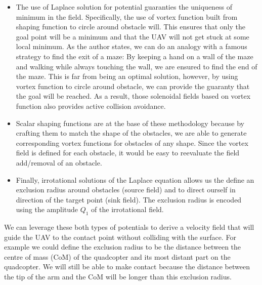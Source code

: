 \begin{itemize}
    \item The use of Laplace solution for potential guaranties the uniqueness of minimum in the field. 
    Specifically, the use of vortex function built from shaping function to circle around obstacle will.
    This ensures that only the goal point will be a minimum and that the UAV will not get stuck at some local minimum. 
    As the author states, we can do an analogy with a famous strategy to find the exit of a maze: 
    By keeping a hand on a wall of the maze and walking while always touching the wall, we are ensured to find the end of the maze. 
    This is far from being an optimal solution, however, by using vortex function to circle around obstacle, we can provide the guaranty that the goal will be reached. 
    As a result, those solenoidal fields based on vortex function also provides active collision avoidance. 
    \item Scalar shaping functions are at the base of these methodology because by crafting them to match the shape of the obstacles, 
    we are able to generate corresponding vortex functions for obstacles of any shape. 
    Since the vortex field is defined for each obstacle, it would be easy to reevaluate the field add/removal of an obstacle.
    \item Finally, irrotational solutions of the Laplace equation allows us the define an exclusion radius around obstacles (source field) and to direct ourself in direction of the target point (sink field).
    The exclusion radius is encoded using the amplitude ${Q}_{1}$ of the irrotational field.
\end{itemize}

We can leverage these both types of potentials to derive a velocity field that will guide the UAV to the contact point without colliding with the surface.
For example we could define the exclusion radius to be the distance between the centre of mass (CoM) of the quadcopter and its most distant part on the quadcopter. 
We will still be able to make contact because the distance between the tip of the arm and the CoM will be longer than this exclusion radius. 



